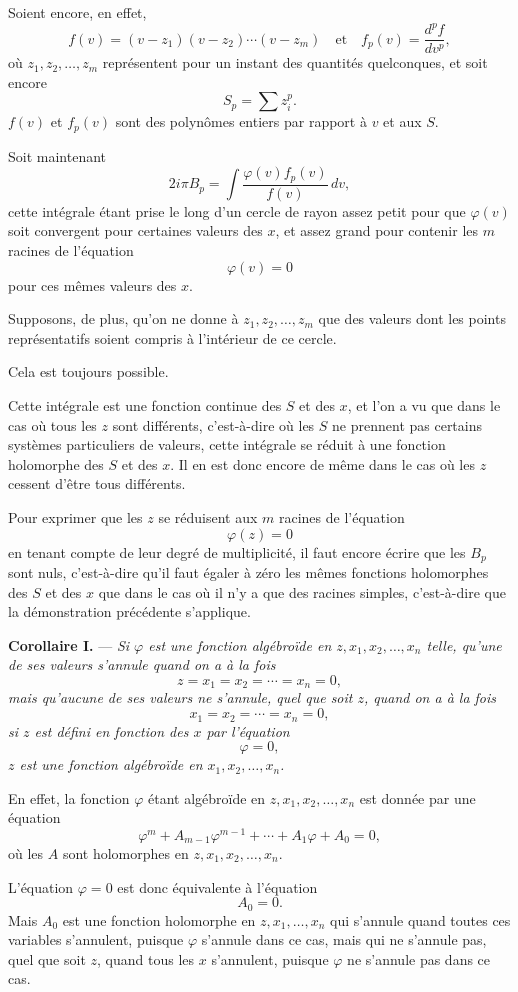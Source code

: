 \documentclass[11pt]{article}
\begin{document}
Soient encore, en effet,
\[
f(v)=(v-z_1)(v-z_2)\cdots(v-z_m)
\quad \text{et}\quad
f_p(v)=\frac{d^p f}{dv^p},
\]
où $z_1,z_2,\ldots,z_m$ représentent pour un instant des quantités quelconques, et soit encore
\[
S_p=\sum z_i^p.
\]
$f(v)$ et $f_p(v)$ sont des polynômes entiers par rapport à $v$ et aux $S$.

Soit maintenant
\[
2i\pi B_p=\int \frac{\varphi(v)f_p(v)}{f(v)}\,dv,
\]
cette intégrale étant prise le long d'un cercle de rayon assez petit pour que $\varphi(v)$ soit convergent pour certaines valeurs des $x$, et assez grand pour contenir les $m$ racines de l'équation
\[
\varphi(v)=0
\]
pour ces mêmes valeurs des $x$.

Supposons, de plus, qu'on ne donne à $z_1,z_2,\ldots,z_m$ que des valeurs dont les points représentatifs soient compris à l'intérieur de ce cercle.

Cela est toujours possible.

Cette intégrale est une fonction continue des $S$ et des $x$, et l'on a vu que dans le cas où tous les $z$ sont différents, c'est-à-dire où les $S$ ne prennent pas certains systèmes particuliers de valeurs, cette intégrale se réduit à une fonction holomorphe des $S$ et des $x$. Il en est donc encore de même dans le cas où les $z$ cessent d'être tous différents.

Pour exprimer que les $z$ se réduisent aux $m$ racines de l'équation
\[
\varphi(z)=0
\]
en tenant compte de leur degré de multiplicité, il faut encore écrire que les $B_p$ sont nuls, c'est-à-dire qu'il faut égaler à zéro les mêmes fonctions holomorphes des $S$ et des $x$ que dans le cas où il n'y a que des racines simples, c'est-à-dire que la démonstration précédente s'applique.

\medskip
\noindent\textbf{Corollaire I.} — \emph{Si $\varphi$ est une fonction algébroïde en $z,x_1,x_2,\ldots,x_n$ telle, qu'une de ses valeurs s'annule quand on a à la fois}
\[
z=x_1=x_2=\cdots=x_n=0,
\]
\emph{mais qu'aucune de ses valeurs ne s'annule, quel que soit $z$, quand on a à la fois}
\[
x_1=x_2=\cdots=x_n=0,
\]
\emph{si $z$ est défini en fonction des $x$ par l'équation}
\[
\varphi=0,
\]
\emph{$z$ est une fonction algébroïde en $x_1,x_2,\ldots,x_n$.}

En effet, la fonction $\varphi$ étant algébroïde en $z,x_1,x_2,\ldots,x_n$ est donnée par une équation
\[
\varphi^m+A_{m-1}\varphi^{m-1}+\cdots+A_1\varphi+A_0=0,
\]
où les $A$ sont holomorphes en $z,x_1,x_2,\ldots,x_n$.

L'équation $\varphi=0$ est donc équivalente à l'équation
\[
A_0=0.
\]
Mais $A_0$ est une fonction holomorphe en $z,x_1,\ldots,x_n$ qui s'annule quand toutes ces variables s'annulent, puisque $\varphi$ s'annule dans ce cas, mais qui ne s'annule pas, quel que soit $z$, quand tous les $x$ s'annulent, puisque $\varphi$ ne s'annule pas dans ce cas.
\end{document}
